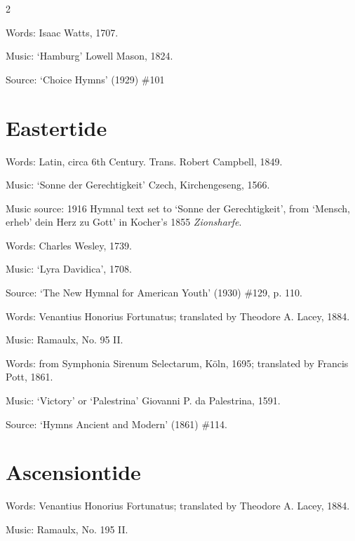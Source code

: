 \begin{multicols}{2}
\par\noindent
Words: Isaac Watts, 1707.
\par\noindent
Music: `Hamburg' Lowell Mason, 1824.
\par\noindent
Source: `Choice Hymns' (1929) \#101


\section*{Eastertide}
\par\noindent
Words: Latin, circa 6th Century. Trans. Robert Campbell, 1849. 
\par\noindent
Music: `Sonne der Gerechtigkeit' Czech, Kirchengeseng, 1566.
\par\noindent
Music source: 1916 Hymnal text set to `Sonne der Gerechtigkeit', from `Mensch, erheb' dein Herz zu Gott' in Kocher's 1855 \textit{Zionsharfe}.


\par\noindent
Words: Charles Wesley, 1739.
\par\noindent
Music: `Lyra Davidica', 1708.
\par\noindent
Source: `The New Hymnal for American Youth' (1930) \#129, p. 110.


\par\noindent
Words: Venantius Honorius Fortunatus; translated by Theodore A. Lacey, 1884.
\par\noindent
Music: Ramaulx, No. 95 II.


\par\noindent
Words: from Symphonia Sirenum Selectarum, Köln, 1695; translated by Francis Pott, 1861.
\par\noindent
Music: `Victory' or  `Palestrina' Giovanni P. da Palestrina, 1591.
\par\noindent
Source: `Hymns Ancient and Modern' (1861) \#114.


\section*{Ascensiontide}

\par\noindent
Words: Venantius Honorius Fortunatus; translated by Theodore A. Lacey, 1884.
\par\noindent
Music: Ramaulx, No. 195 II.



\end{multicols}
